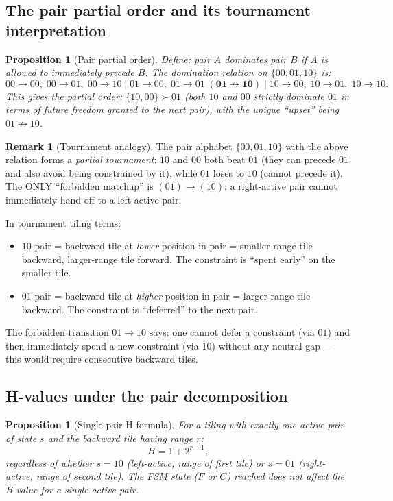 \documentclass[12pt,reqno]{amsart}
\newtheorem{proposition}[theorem]{Proposition}
\theoremstyle{definition}
\newtheorem{remark}[theorem]{Remark}
\theoremstyle{plain}
\begin{document}
\subsection{The pair partial order and its tournament interpretation}
\label{ssec:pair-partial-order}

\begin{proposition}[Pair partial order]\label{prop:pair-order}
Define: pair $A$ \emph{dominates} pair $B$ if $A$ is allowed to immediately
precede $B$.  The domination relation on $\{00,01,10\}$ is:
\[
  00\to 00,\;00\to 01,\;00\to 10\;|\;
  01\to 00,\;01\to 01\;(\mathbf{01\not\to 10})\;|\;
  10\to 00,\;10\to 01,\;10\to 10.
\]
This gives the \emph{partial order}: $\{10,00\}\succ 01$ (both $10$ and $00$
strictly dominate $01$ in terms of future freedom granted to the next pair),
with the unique ``upset'' being $01\not\to10$.
\end{proposition}

\begin{remark}[Tournament analogy]
The pair alphabet $\{00,01,10\}$ with the above relation forms a
\emph{partial tournament}: $10$ and $00$ both beat $01$ (they can
precede $01$ and also avoid being constrained by it), while $01$ loses
to $10$ (cannot precede it).  The ONLY ``forbidden matchup'' is
$(01)\to(10)$: a right-active pair cannot immediately hand off to
a left-active pair.

In tournament tiling terms:
\begin{itemize}
\item $10$ pair = backward tile at \emph{lower} position in pair =
  smaller-range tile backward, larger-range tile forward.
  The constraint is ``spent early'' on the smaller tile.
\item $01$ pair = backward tile at \emph{higher} position in pair =
  larger-range tile backward.
  The constraint is ``deferred'' to the next pair.
\end{itemize}
The forbidden transition $01\to10$ says: one cannot defer a constraint
(via $01$) and then immediately spend a new constraint (via $10$)
without any neutral gap — this would require consecutive backward tiles.
\end{remark}

\subsection{H-values under the pair decomposition}
\label{ssec:pair-H}

\begin{proposition}[Single-pair H formula]\label{prop:single-pair-H}
For a tiling with exactly one active pair of state $s$ and the backward
tile having range $r$:
\[
  H=1+2^{r-1},
\]
regardless of whether $s=10$ (left-active, range of first tile) or
$s=01$ (right-active, range of second tile).
The FSM state ($F$ or $C$) reached does not affect the H-value for a
single active pair.
\end{proposition}
\end{document}
